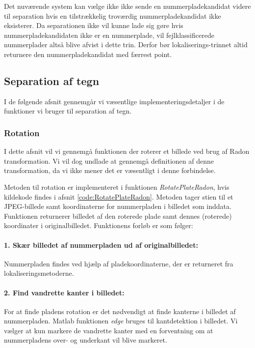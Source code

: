 Det nuværende system kan vælge ikke ikke sende en nummerpladekandidat videre til separation hvis en tilstrækkelig troværdig nummerpladekandidat ikke eksisterer. Da separationen ikke vil kunne lade sig gøre hvis nummerpladekandidaten ikke er en nummerplade, vil fejlklassificerede nummerplader altså blive afvist i dette trin. Derfor bør lokaliserings-trinnet altid returnere den nummerpladekandidat med færrest point.


\subsection{Separation af tegn}

I de følgende afsnit gennemgår vi væsentlige implementeringsdetaljer i de funktioner vi bruger til separation af tegn.

\subsubsection{Rotation}
\label{sec:implementation/sep/rotation}

I dette afsnit vil vi gennemgå funktionen der roterer et billede ved brug af Radon transformation. Vi vil dog undlade at gennemgå definitionen af denne transformation, da vi ikke mener det er væsentligt i denne forbindelse.

Metoden til rotation er implementeret i funktionen \textit{RotatePlateRadon}, hvis kildekode findes i afsnit \vref{code:RotatePlateRadon}. Metoden tager stien til et JPEG-billede samt koordinaterne for nummerpladen i billedet som inddata. Funktionen returnerer billedet af den roterede plade samt dennes (roterede) koordinater i originalbilledet. Funktionens forløb er som følger:

\paragraph{1. Skær billedet af nummerpladen ud af originalbilledet:}
Nummerpladen findes ved hjælp af pladekoordinaterne, der er returneret fra lokaliseringsmetoderne.

\paragraph{2. Find vandrette kanter i billedet:}
For at finde pladens rotation er det nødvendigt at finde kanterne i billedet af nummerpladen. Matlab funktionen \textit{edge} bruges til kantdetektion i billedet. Vi vælger at kun markere de vandrette kanter med en forventning om at nummerpladens over- og underkant vil blive markeret.

